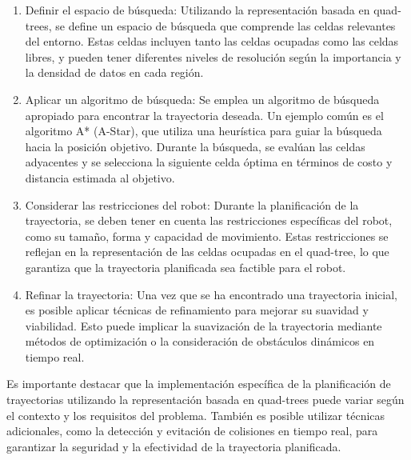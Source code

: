 \documentclass{article}
\begin{document}
\begin{itemize}
  \begin{enumerate}
  \item Definir el espacio de búsqueda: Utilizando la representación basada en quad-trees, se define un espacio de búsqueda que comprende las celdas relevantes del entorno. Estas celdas incluyen tanto las celdas ocupadas como las celdas libres, y pueden tener diferentes niveles de resolución según la importancia y la densidad de datos en cada región.
  \item Aplicar un algoritmo de búsqueda: Se emplea un algoritmo de búsqueda apropiado para encontrar la trayectoria deseada. Un ejemplo común es el algoritmo A* (A-Star), que utiliza una heurística para guiar la búsqueda hacia la posición objetivo. Durante la búsqueda, se evalúan las celdas adyacentes y se selecciona la siguiente celda óptima en términos de costo y distancia estimada al objetivo.
  \item Considerar las restricciones del robot: Durante la planificación de la trayectoria, se deben tener en cuenta las restricciones específicas del robot, como su tamaño, forma y capacidad de movimiento. Estas restricciones se reflejan en la representación de las celdas ocupadas en el quad-tree, lo que garantiza que la trayectoria planificada sea factible para el robot.
  \item Refinar la trayectoria: Una vez que se ha encontrado una trayectoria inicial, es posible aplicar técnicas de refinamiento para mejorar su suavidad y viabilidad. Esto puede implicar la suavización de la trayectoria mediante métodos de optimización o la consideración de obstáculos dinámicos en tiempo real.
  \end{enumerate}

  Es importante destacar que la implementación específica de la planificación de trayectorias utilizando la representación basada en quad-trees puede variar según el contexto y los requisitos del problema. También es posible utilizar técnicas adicionales, como la detección y evitación de colisiones en tiempo real, para garantizar la seguridad y la efectividad de la trayectoria planificada.

  
\end{itemize}

\end{document}
